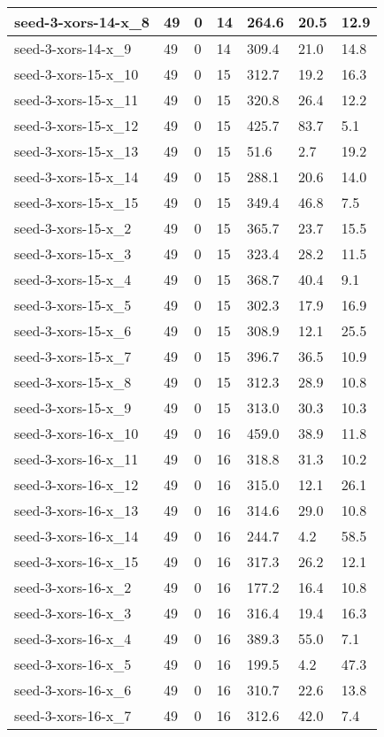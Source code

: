 \begin{scriptsize}
\begin{longtable}{|p{5cm}|l|l|l|l|l|l|}
seed-3-xors-14-x\_8&49&0&14&264.6&20.5&12.9 \\ \hline 
seed-3-xors-14-x\_9&49&0&14&309.4&21.0&14.8 \\ \hline 
seed-3-xors-15-x\_10&49&0&15&312.7&19.2&16.3 \\ \hline 
seed-3-xors-15-x\_11&49&0&15&320.8&26.4&12.2 \\ \hline 
seed-3-xors-15-x\_12&49&0&15&425.7&83.7&5.1 \\ \hline 
seed-3-xors-15-x\_13&49&0&15&51.6&2.7&19.2 \\ \hline 
seed-3-xors-15-x\_14&49&0&15&288.1&20.6&14.0 \\ \hline 
seed-3-xors-15-x\_15&49&0&15&349.4&46.8&7.5 \\ \hline 
seed-3-xors-15-x\_2&49&0&15&365.7&23.7&15.5 \\ \hline 
seed-3-xors-15-x\_3&49&0&15&323.4&28.2&11.5 \\ \hline 
seed-3-xors-15-x\_4&49&0&15&368.7&40.4&9.1 \\ \hline 
seed-3-xors-15-x\_5&49&0&15&302.3&17.9&16.9 \\ \hline 
seed-3-xors-15-x\_6&49&0&15&308.9&12.1&25.5 \\ \hline 
seed-3-xors-15-x\_7&49&0&15&396.7&36.5&10.9 \\ \hline 
seed-3-xors-15-x\_8&49&0&15&312.3&28.9&10.8 \\ \hline 
seed-3-xors-15-x\_9&49&0&15&313.0&30.3&10.3 \\ \hline 
seed-3-xors-16-x\_10&49&0&16&459.0&38.9&11.8 \\ \hline 
seed-3-xors-16-x\_11&49&0&16&318.8&31.3&10.2 \\ \hline 
seed-3-xors-16-x\_12&49&0&16&315.0&12.1&26.1 \\ \hline 
seed-3-xors-16-x\_13&49&0&16&314.6&29.0&10.8 \\ \hline 
seed-3-xors-16-x\_14&49&0&16&244.7&4.2&58.5 \\ \hline 
seed-3-xors-16-x\_15&49&0&16&317.3&26.2&12.1 \\ \hline 
seed-3-xors-16-x\_2&49&0&16&177.2&16.4&10.8 \\ \hline 
seed-3-xors-16-x\_3&49&0&16&316.4&19.4&16.3 \\ \hline 
seed-3-xors-16-x\_4&49&0&16&389.3&55.0&7.1 \\ \hline 
seed-3-xors-16-x\_5&49&0&16&199.5&4.2&47.3 \\ \hline 
seed-3-xors-16-x\_6&49&0&16&310.7&22.6&13.8 \\ \hline 
seed-3-xors-16-x\_7&49&0&16&312.6&42.0&7.4 \\ \hline 

\end{longtable}
\end{scriptsize}
